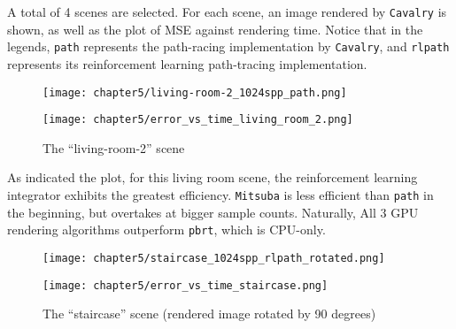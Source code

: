 A total of 4 scenes are selected. For each scene, an image rendered by \texttt{Cavalry} is shown, as well as the plot of MSE against rendering time. Notice that in the legends, \texttt{path} represents the path-racing implementation by \texttt{Cavalry}, and \texttt{rlpath} represents its reinforcement learning path-tracing implementation.

\begin{figure}[H]
    \centering
    
    \begin{minipage}[t]{.99\textwidth}
        \centering
        \vspace{0pt}
        \texttt{[image: chapter5/living-room-2\_1024spp\_path.png]}
    \end{minipage}
    
    \vspace{0.3cm}

    \begin{minipage}[t]{.99\textwidth}
        \centering
        \vspace{0pt}
        \texttt{[image: chapter5/error\_vs\_time\_living\_room\_2.png]}
    \end{minipage}
    
    \caption{The ``living-room-2'' scene}
\end{figure}

As indicated the plot, for this living room scene, the reinforcement learning integrator exhibits the greatest efficiency. \texttt{Mitsuba} is less efficient than \texttt{path} in the beginning, but overtakes at bigger sample counts. Naturally, All 3 GPU rendering algorithms outperform \texttt{pbrt}, which is CPU-only.

\newpage

\begin{figure}[H]
    \centering
    
    \begin{minipage}[t]{.99\textwidth}
        \centering
        \vspace{0pt}
        \texttt{[image: chapter5/staircase\_1024spp\_rlpath\_rotated.png]}
    \end{minipage}
    
    \vspace{0.3cm}

    \begin{minipage}[t]{.99\textwidth}
        \centering
        \vspace{0pt}
        \texttt{[image: chapter5/error\_vs\_time\_staircase.png]}
    \end{minipage}
    
    \caption{The ``staircase'' scene (rendered image rotated by 90 degrees)}
\end{figure}

